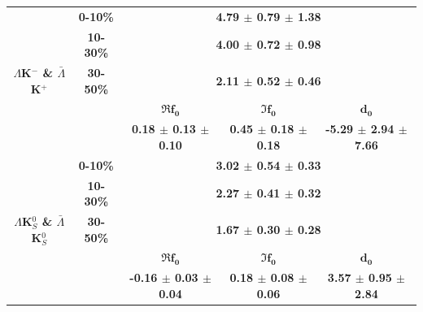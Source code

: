 \documentclass[../AnalysisNoteJBuxton.tex]{subfiles}
\begin{document}
\begin{landscape}
\begin{table}[htbp]
{\begin{tabular}{|c|c|c|c|c|}
  \hline
  \hline
  
  \multirow{5}{*}{\large \textbf{$\Lambda$K$^{-}$ \& $\bar{\Lambda}$K$^{+}$}} 
  &  \textbf{0-10\%} & \multicolumn{3}{c|}{\textbf{4.79 $\pm$ 0.79 $\pm$ 1.38}} \\  %
  & \textbf{10-30\%} & \multicolumn{3}{c|}{\textbf{4.00 $\pm$ 0.72 $\pm$ 0.98}} \\  %
  & \textbf{30-50\%} & \multicolumn{3}{c|}{\textbf{2.11 $\pm$ 0.52 $\pm$ 0.46}} \\  %
  \cline{2-5}
  & & \large $\mathbf{\Re f_{0}}$ & \large $\mathbf{\Im f_{0}}$ & \large $\mathbf{d_{0}}$ \\
  \cline{3-5}     
  & & \textbf{0.18 $\pm$ 0.13 $\pm$ 0.10} & \textbf{0.45 $\pm$ 0.18 $\pm$ 0.18} & \textbf{-5.29 $\pm$ 2.94 $\pm$ 7.66} \\
   
  \hline
  \hline  
  
  \multirow{5}{*}{\large \textbf{$\Lambda$K$^{0}_{S}$ \& $\bar{\Lambda}$K$^{0}_{S}$}}  
   &  \textbf{0-10\%} & \multicolumn{3}{c|}{\textbf{3.02 $\pm$ 0.54 $\pm$ 0.33}} \\  %
   & \textbf{10-30\%} & \multicolumn{3}{c|}{\textbf{2.27 $\pm$ 0.41 $\pm$ 0.32}} \\  %
   & \textbf{30-50\%} & \multicolumn{3}{c|}{\textbf{1.67 $\pm$ 0.30 $\pm$ 0.28}} \\  %
   \cline{2-5}   
   & & \large $\mathbf{\Re f_{0}}$ & \large $\mathbf{\Im f_{0}}$ & \large $\mathbf{d_{0}}$ \\
   \cline{3-5} 
   & & \textbf{-0.16 $\pm$ 0.03 $\pm$ 0.04} & \textbf{0.18 $\pm$ 0.08 $\pm$ 0.06} & \textbf{3.57 $\pm$ 0.95 $\pm$ 2.84} \\
  \hline
 \end{tabular}}
 \label{tab:FitResultsLamKchandLamK0QM2}
\end{table}

\end{landscape}
\pagestyle{plain}
\end{document}

